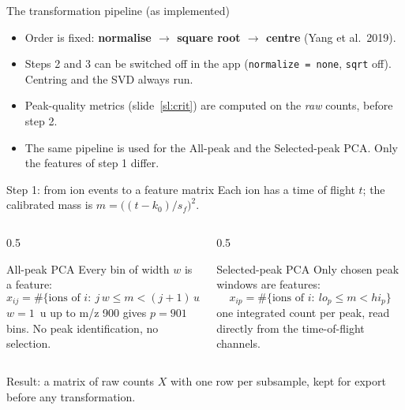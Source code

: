 \documentclass[aspectratio=169,10pt]{beamer}
\newcommand{\hl}[1]{{\color{warm}\bfseries #1}}
\begin{document}
\begin{frame}{The transformation pipeline (as implemented)}
  \centering
  \vspace{5mm}
  \begin{itemize}\setlength\itemsep{2mm}
    \item Order is fixed: \hl{normalise $\rightarrow$ square root $\rightarrow$ centre} (Yang et al.\ 2019).
    \item Steps 2 and 3 can be switched off in the app (\texttt{normalize = none}, \texttt{sqrt} off). Centring and the SVD always run.
    \item Peak-quality metrics (slide~\ref{sl:crit}) are computed on the \emph{raw} counts, before step 2.
    \item The same pipeline is used for the All-peak and the Selected-peak PCA. Only the features of step 1 differ.
  \end{itemize}
\end{frame}

\begin{frame}{Step 1: from ion events to a feature matrix}
  Each ion has a time of flight $t$; the calibrated mass is $m=\big((t-k_0)/s_f\big)^2$.
  \vspace{2mm}
  \begin{columns}[T]
    \begin{column}{0.5\textwidth}
      \begin{block}{All-peak PCA}
        Every bin of width $w$ is a feature:
        \[ x_{ij}=\#\{\text{ions of }i:\ j\,w\le m<(j+1)\,w\} \]
        $w=1$~u up to m/z 900 gives $p=901$ bins. No peak identification, no selection.
      \end{block}
    \end{column}
    \begin{column}{0.5\textwidth}
      \begin{block}{Selected-peak PCA}
        Only chosen peak windows are features:
        \[ x_{ip}=\#\{\text{ions of }i:\ lo_p\le m<hi_p\} \]
        one integrated count per peak, read directly from the time-of-flight channels.
      \end{block}
    \end{column}
  \end{columns}
  \vspace{3mm}
  Result: a matrix of raw counts $X$ with one row per subsample, kept for export before any transformation.
\end{frame}
\end{document}
